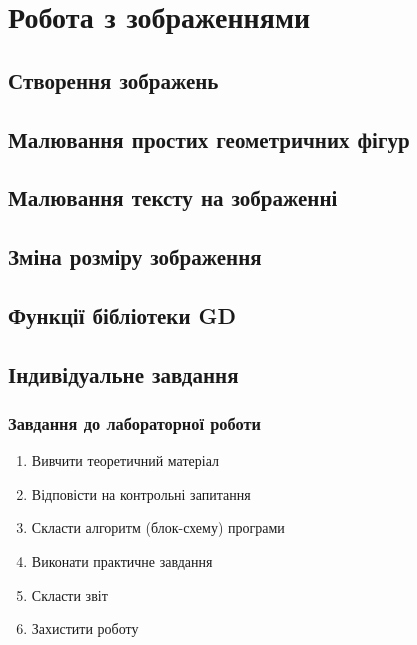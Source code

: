 \chapter{Робота з зображеннями}
\section{Створення зображень}
\section{Малювання простих геометричних фігур}
\section{Малювання тексту на зображенні}
\section{Зміна розміру зображення}
\section{Функції бібліотеки GD}


\pagebreak[3]
\section{Індивідуальне завдання}

\nopagebreak[4]
\subsection*{Завдання до лабораторної роботи}
\nopagebreak[4]
\begin{enumerate}
\item Вивчити теоретичний матеріал
\item Відповісти на контрольні запитання
\item Скласти алгоритм (блок-схему) програми
\item Виконати практичне завдання
\item Скласти звіт
\item Захистити роботу
\end{enumerate}

